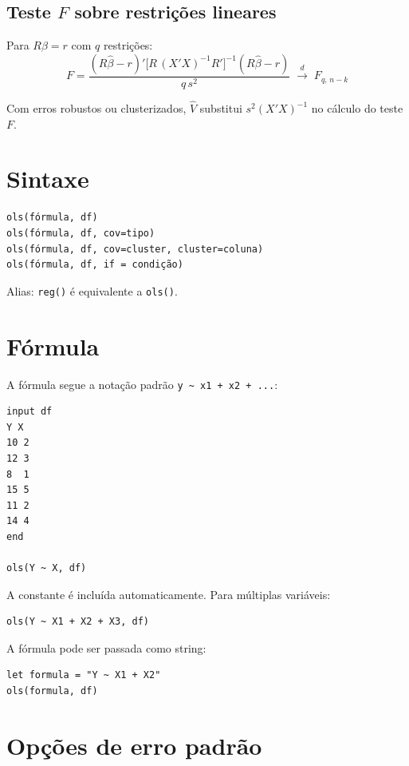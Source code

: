 \subsection*{Teste $F$ sobre restrições lineares}

Para $R\beta = r$ com $q$ restrições:
\[
  F = \frac{(R\hat{\beta} - r)'
       \bigl[R\,(X'X)^{-1}R'\bigr]^{-1}
       (R\hat{\beta} - r)}{q\,s^2}
  \;\xrightarrow{d}\; F_{q,\,n-k}
\]

\begin{nota}
  Com erros robustos ou clusterizados, $\hat{V}$ substitui $s^2(X'X)^{-1}$
  no cálculo do teste $F$.
\end{nota}

\section{Sintaxe}

\begin{lstlisting}
ols(fórmula, df)
ols(fórmula, df, cov=tipo)
ols(fórmula, df, cov=cluster, cluster=coluna)
ols(fórmula, df, if = condição)
\end{lstlisting}

Alias: \lstinline{reg()} é equivalente a \lstinline{ols()}.

\section{Fórmula}

A fórmula segue a notação padrão \texttt{y \textasciitilde{} x1 + x2 + ...}:

\begin{lstlisting}[caption={OLS básico}]
input df
Y X
10 2
12 3
8  1
15 5
11 2
14 4
end

ols(Y ~ X, df)
\end{lstlisting}

A constante é incluída automaticamente. Para múltiplas variáveis:

\begin{lstlisting}
ols(Y ~ X1 + X2 + X3, df)
\end{lstlisting}

A fórmula pode ser passada como string:

\begin{lstlisting}
let formula = "Y ~ X1 + X2"
ols(formula, df)
\end{lstlisting}

\section{Opções de erro padrão}

